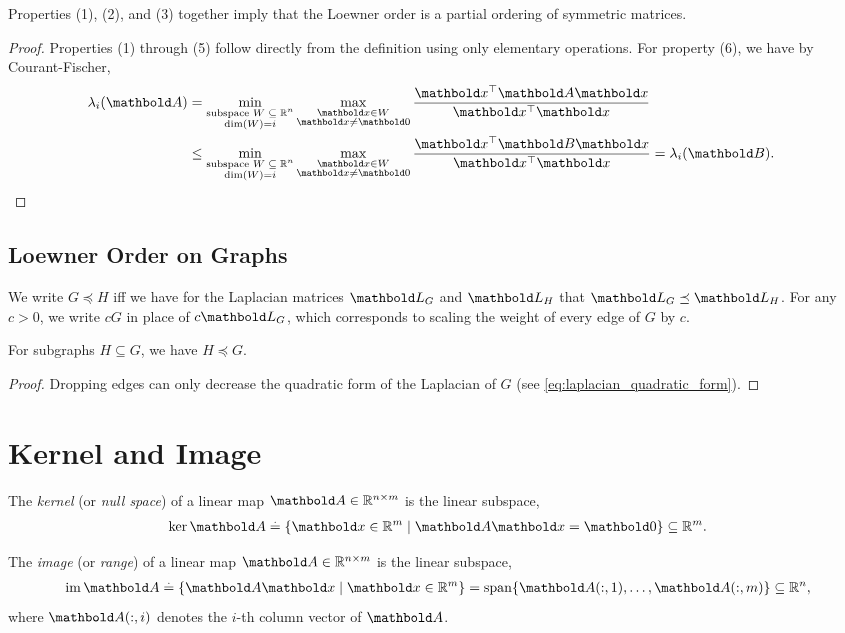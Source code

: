\begin{rmk}
Properties (1), (2), and (3) together imply that the Loewner order is a partial ordering of symmetric matrices.
\end{rmk}
\begin{proof} Properties (1) through (5) follow directly from the definition using only elementary operations. For property (6), we have by Courant-Fischer, \begin{align*}
    \lambda_i(\mA) &= \min_{\substack{\text{subspace $\sW \subseteq \R^n$} \\ \dim(\sW) = i}} \max_{\substack{\vx \in \sW \\ \vx \neq \vZero}} \frac{\trans{\vx}\mA\vx}{\trans{\vx}\vx} \\
    &\leq \min_{\substack{\text{subspace $\sW \subseteq \R^n$} \\ \dim(\sW) = i}} \max_{\substack{\vx \in \sW \\ \vx \neq \vZero}} \frac{\trans{\vx}\mB\vx}{\trans{\vx}\vx} = \lambda_i(\mB). &\qedhere
\end{align*}
\end{proof}

\subsection{Loewner Order on Graphs}

\begin{defn} We write $G \preceq H$ iff we have for the Laplacian matrices $\mL_G$ and $\mL_H$ that $\mL_G \preceq \mL_H$. For any $c > 0$, we write $c G$ in place of $c \mL_G$, which corresponds to scaling the weight of every edge of $G$ by $c$.
\end{defn}
\begin{lem} For subgraphs $H \subseteq G$, we have $H \preceq G$.
\end{lem}
\begin{proof} Dropping edges can only decrease the quadratic form of the Laplacian of $G$ (see \cref{eq:laplacian_quadratic_form}).
\end{proof}

\section{Kernel and Image}

\begin{defn}[Kernel] The \emph{kernel} (or \emph{null space}) of a linear map $\mA \in \R^{n \times m}$ is the linear subspace, \begin{align}
    \ker\mA \defeq \{\vx \in \R^m \mid \mA\vx = \vZero\}\subseteq \R^m.
\end{align}
\end{defn}
\begin{defn}[Image] The \emph{image} (or \emph{range}) of a linear map $\mA \in \R^{n \times m}$ is the linear subspace, \begin{align}
    \im\mA \defeq \{\mA\vx \mid \vx \in \R^m\} = \vspan\{\mA(:,1), \dots, \mA(:,m)\} \subseteq \R^n,
\end{align} where $\mA(:,i)$ denotes the $i$-th column vector of $\mA$.
\end{defn}

